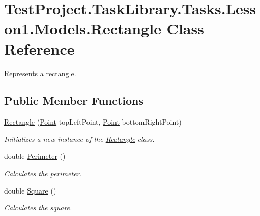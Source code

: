 \hypertarget{class_test_project_1_1_task_library_1_1_tasks_1_1_lesson1_1_1_models_1_1_rectangle}{}\section{Test\+Project.\+Task\+Library.\+Tasks.\+Lesson1.\+Models.\+Rectangle Class Reference}
\label{class_test_project_1_1_task_library_1_1_tasks_1_1_lesson1_1_1_models_1_1_rectangle}


Represents a rectangle.  


\subsection*{Public Member Functions}
\begin{DoxyCompactItemize}
\item 
\mbox{\hyperlink{class_test_project_1_1_task_library_1_1_tasks_1_1_lesson1_1_1_models_1_1_rectangle_a733e7a90317e3682bad2cc9fd7b43b71}{Rectangle}} (\mbox{\hyperlink{class_test_project_1_1_task_library_1_1_tasks_1_1_lesson1_1_1_models_1_1_point}{Point}} top\+Left\+Point, \mbox{\hyperlink{class_test_project_1_1_task_library_1_1_tasks_1_1_lesson1_1_1_models_1_1_point}{Point}} bottom\+Right\+Point)
\begin{DoxyCompactList}\small\item\em Initializes a new instance of the \mbox{\hyperlink{class_test_project_1_1_task_library_1_1_tasks_1_1_lesson1_1_1_models_1_1_rectangle}{Rectangle}} class. \end{DoxyCompactList}\item 
double \mbox{\hyperlink{class_test_project_1_1_task_library_1_1_tasks_1_1_lesson1_1_1_models_1_1_rectangle_a4aee39825d6cb65cf5088becc58df3d0}{Perimeter}} ()
\begin{DoxyCompactList}\small\item\em Calculates the perimeter. \end{DoxyCompactList}\item 
double \mbox{\hyperlink{class_test_project_1_1_task_library_1_1_tasks_1_1_lesson1_1_1_models_1_1_rectangle_ae1afd74cf0e8bc3f7190ce37da10b943}{Square}} ()
\begin{DoxyCompactList}\small\item\em Calculates the square. \end{DoxyCompactList}\end{DoxyCompactItemize}
